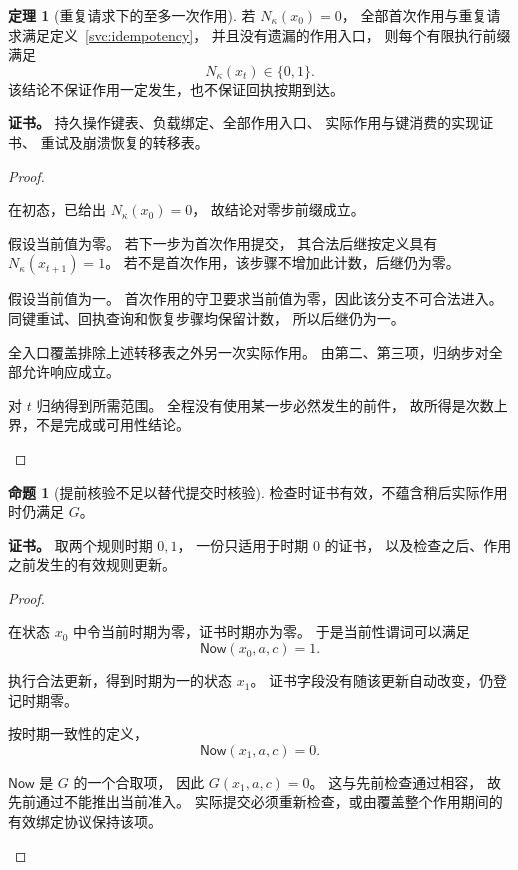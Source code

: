 \documentclass[UTF8,12pt,a4paper,openany,fontset=none,zihao=false]{ctexrep}
\theoremstyle{definition}
\newtheorem{theorem}{定理}[chapter]
\newtheorem{proposition}{命题}[chapter]
\newenvironment{certificate}{\par\noindent\textbf{证书。}\ignorespaces}{\par}
\newcommand{\1}{\mathbf 1}
\begin{document}
\begin{theorem}[重复请求下的至多一次作用]
\label{svc:at-most-once}
若 \(N_\kappa(x_0)=0\)，
全部首次作用与重复请求满足定义~\ref{svc:idempotency}，
并且没有遗漏的作用入口，
则每个有限执行前缀满足
\[
N_\kappa(x_t)\in\{0,1\}.
\]
该结论不保证作用一定发生，也不保证回执按期到达。
\end{theorem}
\begin{certificate}
持久操作键表、负载绑定、全部作用入口、
实际作用与键消费的实现证书、
重试及崩溃恢复的转移表。
\end{certificate}
\begin{proof}
\begin{semanticsteps}
\item 在初态，已给出 \(N_\kappa(x_0)=0\)，
故结论对零步前缀成立。
\item 假设当前值为零。
若下一步为首次作用提交，
其合法后继按定义具有 \(N_\kappa(x_{t+1})=1\)。
若不是首次作用，该步骤不增加此计数，后继仍为零。
\item 假设当前值为一。
首次作用的守卫要求当前值为零，因此该分支不可合法进入。
同键重试、回执查询和恢复步骤均保留计数，
所以后继仍为一。
\item 全入口覆盖排除上述转移表之外另一次实际作用。
由第二、第三项，归纳步对全部允许响应成立。
\item 对 \(t\) 归纳得到所需范围。
全程没有使用某一步必然发生的前件，
故所得是次数上界，不是完成或可用性结论。
\end{semanticsteps}
\end{proof}

\begin{proposition}[提前核验不足以替代提交时核验]
\label{svc:current-binding}
检查时证书有效，不蕴含稍后实际作用时仍满足 \(G\)。
\end{proposition}
\begin{certificate}
取两个规则时期 \(0,1\)，
一份只适用于时期 \(0\) 的证书，
以及检查之后、作用之前发生的有效规则更新。
\end{certificate}
\begin{proof}
\begin{semanticsteps}
\item 在状态 \(x_0\) 中令当前时期为零，证书时期亦为零。
于是当前性谓词可以满足
\[
\mathsf{Now}(x_0,a,c)=1.
\]
\item 执行合法更新，得到时期为一的状态 \(x_1\)。
证书字段没有随该更新自动改变，仍登记时期零。
\item 按时期一致性的定义，
\[
\mathsf{Now}(x_1,a,c)=0.
\]
\item \(\mathsf{Now}\) 是 \(G\) 的一个合取项，
因此 \(G(x_1,a,c)=0\)。
这与先前检查通过相容，
故先前通过不能推出当前准入。
实际提交必须重新检查，或由覆盖整个作用期间的有效绑定协议保持该项。
\end{semanticsteps}
\end{proof}
\end{document}
